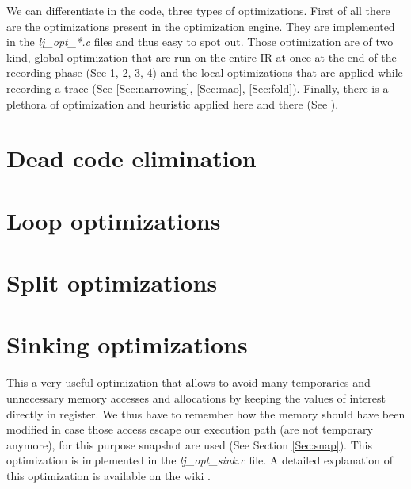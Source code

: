 
We can differentiate in the code, three types of optimizations.
First of all there are the optimizations present in the optimization engine.
They are implemented in the \emph{lj\_opt\_*.c} files and thus easy to spot out.
Those optimization are of two kind, global optimization that are run on the
entire IR at once at the end of the recording phase (See \ref{Sec:opt-dce}, \ref{Sec:opt-loop}, \ref{Sec:opt-split}, \ref{Sec:opt-sinking}) and the local
optimizations that are applied while recording a trace (See \ref{Sec:narrowing},
\ref{Sec:mao}, \ref{Sec:fold}).
Finally, there is a plethora of optimization and heuristic applied here and
there (See ).


\section{Dead code elimination}
\label{Sec:opt-dce}

\section{Loop optimizations}
\label{Sec:opt-loop}

\section{Split optimizations}
\label{Sec:opt-split}

\section{Sinking optimizations}
\label{Sec:opt-sinking}
This a very useful optimization that allows to avoid many temporaries and
unnecessary memory accesses and allocations by keeping the values of interest
directly in register. We thus have to remember how the memory should have been
modified in case those access escape our execution path (are not temporary
anymore), for this purpose snapshot are used (See Section \ref{Sec:snap}). This optimization is implemented
in the \emph{lj\_opt\_sink.c} file. A detailed explanation of this optimization
is available on the wiki \cite{luajit-sink}.


